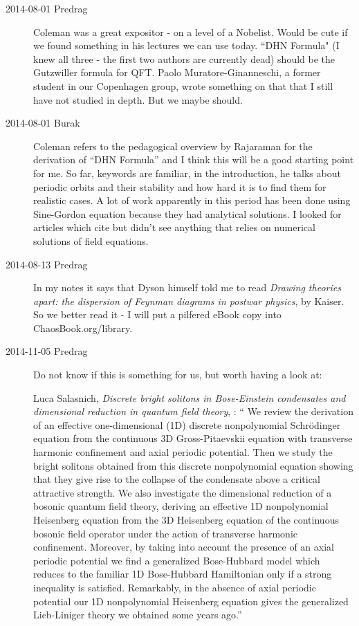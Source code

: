 \begin{description}
\item[2014-08-01 Predrag]
Coleman was a great expositor - on a level of a Nobelist. Would be cute
if we found something in his lectures we can use today. ``DHN Formula" (I
knew all three - the first two authors are currently dead) should be the
Gutzwiller formula for QFT. Paolo Muratore-Ginanneschi, a former student
in our Copenhagen group, wrote something on that that I still
have not studied in depth. But we maybe should.

\item[2014-08-01 Burak]
Coleman refers to the pedagogical overview by Rajaraman  for the derivation
of ``DHN Formula'' and I think this will be a good starting point for me. So far,
keywords are familiar, in the introduction, he talks about periodic orbits and
their stability and how hard it is to find them for realistic cases. A lot of work
apparently in this period has been done using Sine-Gordon equation because they
had analytical solutions. I looked for articles which cite  but didn't
see anything that relies on numerical solutions of field equations.

\item[2014-08-13 Predrag]
In my notes it says that Dyson himself told me to read {\em Drawing
theories apart: the dispersion of {Feynman} diagrams in postwar physics},
by Kaiser. So we better read it - I will put a pilfered
eBook copy 
into ChaosBook.org/library.

\item[2014-11-05 Predrag]
Do not know if this is something for us, but worth having a look at:

Luca Salasnich,
 \emph{Discrete bright solitons in Bose-Einstein condensates and dimensional
  reduction in quantum field theory}, :
`` We  review the derivation of an effective one-dimensional (1D) discrete
nonpolynomial Schr\"odinger equation from the continuous 3D Gross-Pitaevskii
equation with transverse harmonic confinement and axial periodic potential.
Then we study the bright solitons obtained from this discrete nonpolynomial
equation showing that they give rise to the collapse of the condensate above a
critical attractive strength. We also investigate the dimensional reduction of
a bosonic quantum field theory, deriving an effective 1D nonpolynomial
Heisenberg equation from the 3D Heisenberg equation of the continuous bosonic
field operator under the action of transverse harmonic confinement. Moreover,
by taking into account the presence of an axial periodic potential we find a
generalized Bose-Hubbard model which reduces to the familiar 1D Bose-Hubbard
Hamiltonian only if a strong inequality is satisfied. Remarkably, in the
absence of axial periodic potential our 1D nonpolynomial Heisenberg equation
gives the generalized Lieb-Liniger theory we obtained some years ago.''


\end{description}
